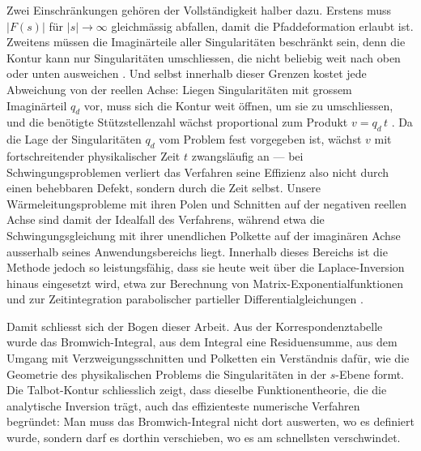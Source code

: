 Zwei Einschränkungen gehören der Vollständigkeit halber dazu.
Erstens muss $|F(s)|$ für $|s| \to \infty$ gleichmässig abfallen, damit
die Pfaddeformation erlaubt ist.
Zweitens müssen die Imaginärteile aller Singularitäten beschränkt sein,
denn die Kontur kann nur Singularitäten umschliessen, die nicht beliebig
weit nach oben oder unten ausweichen \cite{laplace:talbot1979}.
Und selbst innerhalb dieser Grenzen kostet jede Abweichung von der
reellen Achse:
Liegen Singularitäten mit grossem Imaginärteil $q_d$ vor, muss sich die
Kontur weit öffnen, um sie zu umschliessen, und die benötigte
Stützstellenzahl wächst proportional zum Produkt $v = q_d \, t$
\cite{laplace:talbot1979}.
Da die Lage der Singularitäten $q_d$ vom Problem fest vorgegeben ist,
wächst $v$ mit fortschreitender physikalischer Zeit $t$ zwangsläufig an
--- bei Schwingungsproblemen verliert das Verfahren seine Effizienz also
nicht durch einen behebbaren Defekt, sondern durch die Zeit selbst.
Unsere Wärmeleitungsprobleme mit ihren Polen und Schnitten auf der
negativen reellen Achse sind damit der Idealfall des Verfahrens, während
etwa die Schwingungsgleichung mit ihrer unendlichen Polkette auf der
imaginären Achse ausserhalb seines Anwendungsbereichs liegt.
Innerhalb dieses Bereichs ist die Methode jedoch so leistungsfähig, dass
sie heute weit über die Laplace-Inversion hinaus eingesetzt wird, etwa zur
Berechnung von Matrix-Exponentialfunktionen und zur Zeitintegration
parabolischer partieller Differentialgleichungen
\cite{laplace:trefethen2006}.

Damit schliesst sich der Bogen dieser Arbeit.
Aus der Korrespondenztabelle wurde das Bromwich-Integral, aus dem Integral
eine Residuensumme, aus dem Umgang mit Verzweigungsschnitten und
Polketten ein Verständnis dafür, wie die Geometrie des physikalischen
Problems die Singularitäten in der $s$-Ebene formt.
Die Talbot-Kontur schliesslich zeigt, dass dieselbe Funktionentheorie, die
die analytische Inversion trägt, auch das effizienteste numerische
Verfahren begründet:
Man muss das Bromwich-Integral nicht dort auswerten, wo es definiert
wurde, sondern darf es dorthin verschieben, wo es am schnellsten
verschwindet.
